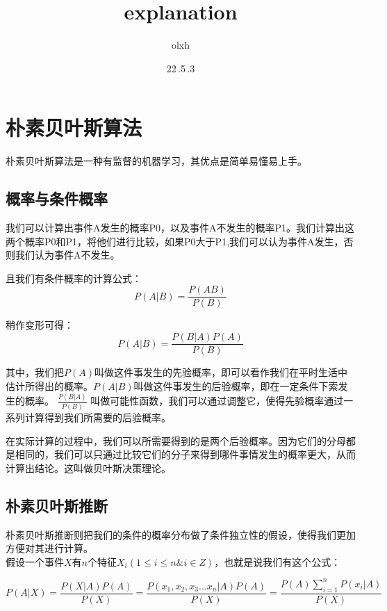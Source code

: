 \documentclass[11pt,twoside,a4paper]{article}
\begin{document}
    \title{explanation}
    \author{olxh}
    \date{22\,.5\,.3}

    \maketitle

    \section{朴素贝叶斯算法}
    朴素贝叶斯算法是一种有监督的机器学习，其优点是简单易懂易上手。


    \subsection{概率与条件概率}
    我们可以计算出事件A发生的概率P0，以及事件A不发生的概率P1。我们计算出这两个概率P0和P1，将他们进行比较，如果P0大于P1,我们可以认为事件A发生，否则我们认为事件A不发生。


    且我们有条件概率的计算公式：
    \begin{displaymath}
        P(A|B) =  \frac{P(AB)}{P(B)}
    \end{displaymath}

    稍作变形可得：
    \begin{displaymath}
        P(A|B) = \frac{P(B|A)P(A)}{P(B)}
    \end{displaymath}


    其中，我们把$P(A)$叫做这件事发生的先验概率，即可以看作我们在平时生活中估计所得出的概率。$P(A|B)$叫做这件事发生的后验概率，即在一定条件下索发生的概率。
    $\frac{P(B|A)}{P(B)}$
    叫做可能性函数，我们可以通过调整它，使得先验概率通过一系列计算得到我们所需要的后验概率。


    在实际计算的过程中，我们可以所需要得到的是两个后验概率。因为它们的分母都是相同的，我们可以只通过比较它们的分子来得到哪件事情发生的概率更大，从而计算出结论。这叫做贝叶斯决策理论。



    \subsection{朴素贝叶斯推断}

    朴素贝叶斯推断则把我们的条件的概率分布做了条件独立性的假设，使得我们更加方便对其进行计算。\\
    假设一个事件$X$有$n$个特征$X_{i}(1 \leq i \leq n \& i \in Z )$，也就是说我们有这个公式：
    
    \begin{displaymath}
        P(A|X) = \frac{P(X|A)P(A)}{P(X)}=\frac{P(x_1,x_2,x_3 \ldots x_n|A)P(A)}{P(X)} = \frac{P(A) {\sum_{i=1}^{n} P(x_i|A)} }{P(X)}
    \end{displaymath}
\end{document}
